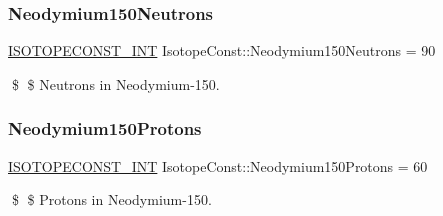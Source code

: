 \subsubsection{\texorpdfstring{Neodymium150\+Neutrons}{Neodymium150Neutrons}}
{\footnotesize\ttfamily \mbox{\hyperlink{group___isotope_const-_macros_ga5f18360b3e99483a35c32d789e62621c}{I\+S\+O\+T\+O\+P\+E\+C\+O\+N\+S\+T\+\_\+\+I\+NT}} Isotope\+Const\+::\+Neodymium150\+Neutrons = 90}

\$ \$ Neutrons in Neodymium-\/150. \mbox{\label{group___isotope_const-_neodymium-_nd150_ga105c73bb78ff1b731397e578b27db388}} 
\subsubsection{\texorpdfstring{Neodymium150\+Protons}{Neodymium150Protons}}
{\footnotesize\ttfamily \mbox{\hyperlink{group___isotope_const-_macros_ga5f18360b3e99483a35c32d789e62621c}{I\+S\+O\+T\+O\+P\+E\+C\+O\+N\+S\+T\+\_\+\+I\+NT}} Isotope\+Const\+::\+Neodymium150\+Protons = 60}

\$ \$ Protons in Neodymium-\/150. 
